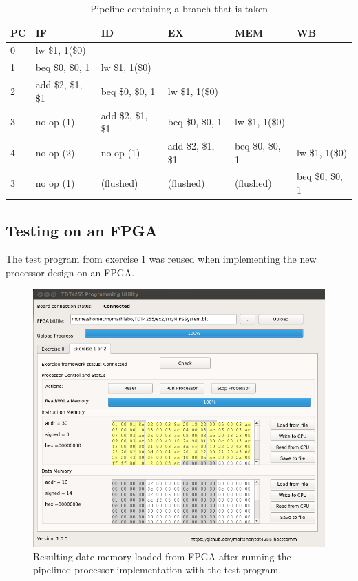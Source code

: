 \begin{table}[h]
    \begin{tabular}{l|lllll}
    PC & IF                 & ID                 & EX                 & MEM              & WB               \\ \hline
    0  & lw   \$1, 1(\$0)   & ~                  & ~                  & ~                & ~                \\
    1  & beq  \$0, \$0, 1   & lw   \$1, 1(\$0)   & ~                  & ~                & ~                \\
    2  & add  \$2, \$1, \$1 & beq  \$0, \$0, 1   & lw   \$1, 1(\$0)   & ~                & ~                \\
    3  & no op (1)          & add  \$2, \$1, \$1 & beq  \$0, \$0, 1   & lw   \$1, 1(\$0) & ~                \\
    4  & no op (2)          & no op (1)          & add  \$2, \$1, \$1 & beq  \$0, \$0, 1 & lw   \$1, 1(\$0) \\
    3  & no op (1)          & (flushed)          & (flushed)          & (flushed)        & beq  \$0, \$0, 1 \\
    \end{tabular}
\caption{Pipeline containing a branch that is taken}
\label{tbl:branching}
\end{table}

\subsection{Testing on an FPGA}
The test program from exercise 1 was reused when implementing the new processor design on an FPGA.

\begin{figure}[h]
    \centering
    \includegraphics[width=\textwidth]{img/hostcomm}
    \caption{Resulting date memory loaded from FPGA after running the pipelined processor implementation with the test program.}
    \label{fig:hostcomm}
\end{figure}

